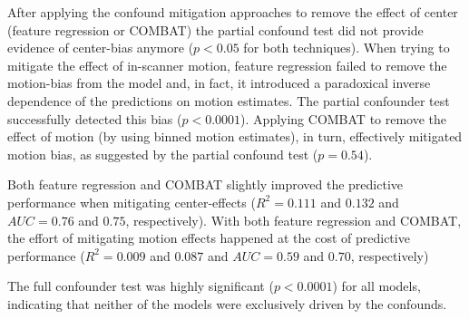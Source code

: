 \documentclass{article}
\begin{document}
After applying the confound mitigation approaches to remove the effect of center (feature regression or COMBAT) the partial confound test did not provide evidence of center-bias anymore ($p < 0.05$ for both techniques). When trying to mitigate the effect of in-scanner motion, feature regression failed to remove the motion-bias from the model and, in fact, it introduced a paradoxical inverse dependence of the predictions on motion estimates. The partial confounder test successfully detected this bias ($p<0.0001$). Applying COMBAT to remove the effect of motion (by using binned motion estimates), in turn, effectively mitigated motion bias, as suggested by the partial confound test ($p=0.54$).

Both feature regression and COMBAT slightly improved the predictive performance when mitigating center-effects ($R^2=0.111$ and $0.132$ and $AUC=0.76$ and $0.75$, respectively). With both feature regression and COMBAT, the effort of mitigating motion effects happened at the cost of predictive performance ($R^2=0.009$ and $0.087$ and $AUC=0.59$ and $0.70$, respectively)

The full confounder test was highly significant ($p<0.0001$) for all models, indicating that neither of the models were exclusively driven by the confounds.
\end{document}
